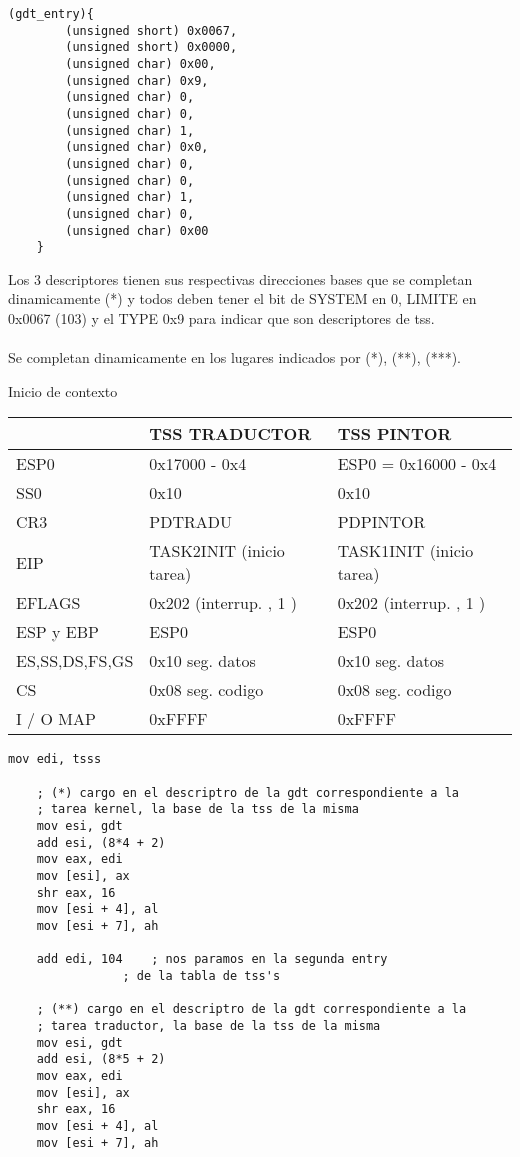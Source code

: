 \documentclass[11pt]{article}
\begin{document}
\begin{enumerate}
\begin{enumerate}
\begin{lstlisting}[frame=single]
	(gdt_entry){ 
		(unsigned short) 0x0067, 
		(unsigned short) 0x0000,
		(unsigned char) 0x00, 
		(unsigned char) 0x9,
		(unsigned char) 0, 
		(unsigned char) 0, 
		(unsigned char) 1, 
		(unsigned char) 0x0,
		(unsigned char) 0,  
		(unsigned char) 0,  
		(unsigned char) 1,  
		(unsigned char) 0, 
		(unsigned char) 0x00 
	}
\end{lstlisting}
\end{enumerate}
Los 3 descriptores tienen sus respectivas direcciones bases que se completan dinamicamente (*) y todos deben tener el bit de SYSTEM en 0, LIMITE en 0x0067 (103) y el TYPE 0x9 para indicar que son descriptores de tss. \\
\\
Se completan dinamicamente en los lugares indicados por (*), (**), (***). \\
\begin{center} Inicio de contexto \\
\begin{tabular}[t]{|l|l|l|}
\hline
\textbf{} & \textbf{TSS TRADUCTOR} & \textbf{TSS PINTOR} \\
\hline
ESP0 & 0x17000 - 0x4 & ESP0 = 0x16000 - 0x4 \\
SS0 & 0x10 & 0x10 \\
CR3 & PDTRADU & PDPINTOR \\
EIP & TASK2INIT (inicio tarea) & TASK1INIT (inicio tarea) \\
EFLAGS & 0x202 (interrup. , 1 ) & 0x202 (interrup. , 1 ) \\
ESP y EBP & ESP0 & ESP0 \\
ES,SS,DS,FS,GS & 0x10 seg. datos & 0x10 seg. datos \\
CS & 0x08 seg. codigo & 0x08 seg. codigo \\
I / O MAP & 0xFFFF & 0xFFFF \\
\hline
\end{tabular}
\end{center}
\begin{lstlisting}[frame=single]
	mov	edi, tsss

	; (*) cargo en el descriptro de la gdt correspondiente a la 
	; tarea kernel, la base de la tss de la misma
	mov	esi, gdt
	add	esi, (8*4 + 2)
	mov	eax, edi
	mov	[esi], ax
	shr	eax, 16
	mov	[esi + 4], al
	mov	[esi + 7], ah
	
	add	edi, 104	; nos paramos en la segunda entry
				; de la tabla de tss's

	; (**) cargo en el descriptro de la gdt correspondiente a la
	; tarea traductor, la base de la tss de la misma
	mov	esi, gdt
	add	esi, (8*5 + 2)
	mov	eax, edi
	mov	[esi], ax
	shr	eax, 16
	mov	[esi + 4], al
	mov	[esi + 7], ah


\end{lstlisting}
\end{enumerate}
\end{document}

